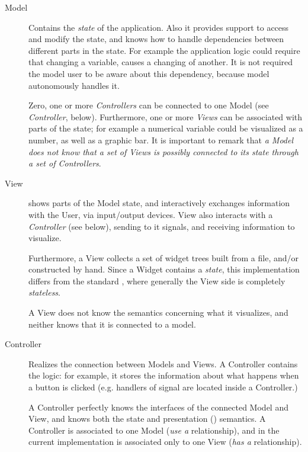 \begin{description}
\item[Model] Contains the \emph{state} of the application. Also it
  provides support to access and modify the state, and knows how to
  handle dependencies between different parts in the state. For
  example the application logic could require that changing a
  variable, causes a changing of another. It is not required the
  model user to be aware about this dependency, because model
  autonomously handles it.

  Zero, one or more \emph{Controllers} can be connected to one Model
  (see \emph{Controller}, below). Furthermore, one or more
  \emph{Views} can be associated with parts of the state; for example
  a numerical variable could be visualized as a number, as well as a
  graphic bar. It is important to remark that \emph{a Model does not
    know that a set of Views is possibly connected to its state
    through a set of Controllers}.

\item[View] shows parts of the Model state, and interactively
  exchanges information with the User, via input/output devices.  View
  also interacts with a \emph{Controller} (see below), sending to it
  signals, and receiving information to visualize.

  Furthermore, a View collects a set of widget trees built from a
  \glade file, and/or constructed by hand. Since a Widget contains a
  \emph{state}, this implementation differs from the standard \mvc,
  where generally the View side is completely \emph{stateless}.

  A View does not know the semantics concerning what it visualizes,
  and neither knows that it is connected to a model. 

\item[Controller] Realizes the connection between Models and Views.
  A Controller contains the \gui logic: for example, it stores the
  information about what happens when a button is clicked (e.g. 
  handlers of signal are located inside a Controller.)

  A Controller perfectly knows the interfaces of the connected Model
  and View, and knows both the state and presentation (\gui)
  semantics. A Controller is associated to one Model (\emph{use a}
  relationship), and in the current implementation is associated
  only to one View (\emph{has a} relationship).

\end{description}


